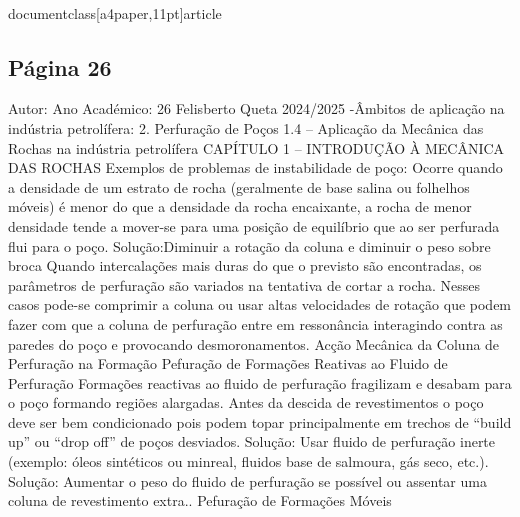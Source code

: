 \\documentclass[a4paper,11pt]{article}
\begin{document}
\subsection*{Página 26}
Autor:
Ano Académico:
26
Felisberto Queta
2024/2025
-Âmbitos de aplicação na indústria petrolífera:
2. Perfuração de Poços
1.4 – Aplicação da Mecânica das Rochas na indústria petrolífera
CAPÍTULO 1 – INTRODUÇÃO À MECÂNICA DAS ROCHAS
Exemplos de problemas de instabilidade de poço:
Ocorre quando a densidade de um 
estrato de rocha (geralmente de base 
salina ou folhelhos móveis) é menor do 
que a densidade da rocha encaixante, a 
rocha de menor densidade tende a 
mover-se para uma posição de equilíbrio 
que ao ser perfurada flui para o poço.
Solução:Diminuir a rotação da coluna e 
diminuir o peso sobre broca
Quando intercalações mais duras do que o 
previsto são encontradas, os parâmetros 
de perfuração são variados na tentativa de 
cortar a rocha. Nesses casos pode-se 
comprimir a coluna ou usar altas 
velocidades de rotação que podem fazer 
com que a coluna de perfuração entre em 
ressonância interagindo contra as paredes 
do poço e provocando desmoronamentos.
Acção Mecânica
da Coluna de
Perfuração na
Formação
Pefuração de 
Formações 
Reativas ao 
Fluido de 
Perfuração
Formações reactivas ao fluido de perfuração 
fragilizam e desabam para o poço formando 
regiões alargadas. Antes da descida de 
revestimentos o poço deve ser bem 
condicionado pois podem topar 
principalmente em trechos de “build up” ou 
“drop off” de poços desviados.
Solução: Usar fluido de perfuração inerte 
(exemplo: óleos sintéticos ou minreal, 
fluidos base de salmoura, gás seco, etc.).
Solução: Aumentar o peso do fluido 
de perfuração se possível ou 
assentar uma coluna de 
revestimento extra..
Pefuração de 
Formações 
Móveis
\end{document}

